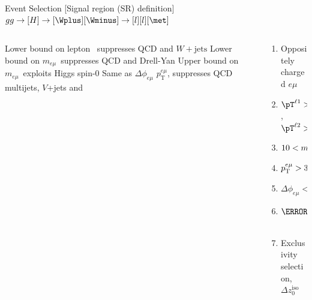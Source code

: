 \documentclass[10pt]{beamer}
\newcommand*{\Wjets}{\ensuremath{W+\text{jets}}}
\newcommand*{\pTemu}{\ensuremath{p_{\textrm{T}}^{e\mu}}}
\newcommand*{\memu}{\ensuremath{m_{e\mu}}}
\newcommand*{\dFem}{\ensuremath{\Delta\phi_{e\mu}}}
\newcommand*{\DZ}{\ensuremath{\Delta z_0^{\mathrm{iso}}}}
\begin{document}
\begin{frame}{Event Selection [Signal region (SR) definition]}
\centering
{\color{blue}\large $gg\to[H]\to[\Wplus][\Wminus]\to[l][l][\met]$}

\vspace*{\baselineskip}

\begin{columns}
	\begin{column}{0.5\linewidth}
\begin{outline}
\1 Lower bound on lepton \pt\ suppresses QCD and \Wjets 
\1 Lower bound on \memu\ suppresses QCD and Drell-Yan 
\1 Upper bound on \memu\ exploits Higgs spin-0
	\2 Same as \dFem
\1 $\pTemu$, suppresses QCD multijets, $V$+jets and 
\end{outline}
	\end{column}
	\begin{column}{0.5\linewidth}
\begin{tcolorbox}[title=Signal Selection, width=\linewidth, colback=white,colframe=red!50!white,nobeforeafter,tcbox raise base,top=0pt,left=0pt,right=0pt,bottom=0pt]
\begin{enumerate}
\item Oppositely charged $e\mu$   
\item   $\pT^{\ell 1} > 25$, $\pT^{\ell 2} > 15\GeV$ 
\item  $10< \memu <55\GeV$    
\item $\pTemu > 30\GeV$
\item $\dFem < 1.8$       
\item $\mT <140$~\GeV       
\item Exclusivity selection, \DZ
\end{enumerate}
\end{tcolorbox}
	\end{column}
\end{columns}
\end{frame}
\end{document}
